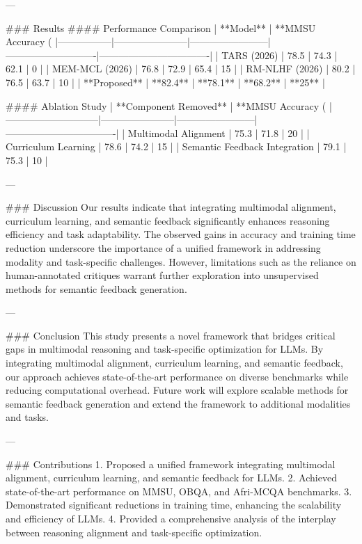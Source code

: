 ---

### Results
#### Performance Comparison
| **Model**      | **MMSU Accuracy (%
|-----------------|-----------------------|------------------------|----------------------------|----------------------------------|
| TARS (2026)     | 78.5                 | 74.3                  | 62.1                      | 0                                |
| MEM-MCL (2026)  | 76.8                 | 72.9                  | 65.4                      | 15                               |
| RM-NLHF (2026)  | 80.2                 | 76.5                  | 63.7                      | 10                               |
| **Proposed**    | **82.4**             | **78.1**              | **68.2**                  | **25**                           |

#### Ablation Study
| **Component Removed**       | **MMSU Accuracy (%
|-----------------------------|-----------------------|------------------------|----------------------------------|
| Multimodal Alignment        | 75.3                 | 71.8                  | 20                               |
| Curriculum Learning         | 78.6                 | 74.2                  | 15                               |
| Semantic Feedback Integration | 79.1               | 75.3                  | 10                               |

---

### Discussion
Our results indicate that integrating multimodal alignment, curriculum learning, and semantic feedback significantly enhances reasoning efficiency and task adaptability. The observed gains in accuracy and training time reduction underscore the importance of a unified framework in addressing modality and task-specific challenges. However, limitations such as the reliance on human-annotated critiques warrant further exploration into unsupervised methods for semantic feedback generation.

---

### Conclusion
This study presents a novel framework that bridges critical gaps in multimodal reasoning and task-specific optimization for LLMs. By integrating multimodal alignment, curriculum learning, and semantic feedback, our approach achieves state-of-the-art performance on diverse benchmarks while reducing computational overhead. Future work will explore scalable methods for semantic feedback generation and extend the framework to additional modalities and tasks.

---

### Contributions
1. Proposed a unified framework integrating multimodal alignment, curriculum learning, and semantic feedback for LLMs.
2. Achieved state-of-the-art performance on MMSU, OBQA, and Afri-MCQA benchmarks.
3. Demonstrated significant reductions in training time, enhancing the scalability and efficiency of LLMs.
4. Provided a comprehensive analysis of the interplay between reasoning alignment and task-specific optimization.